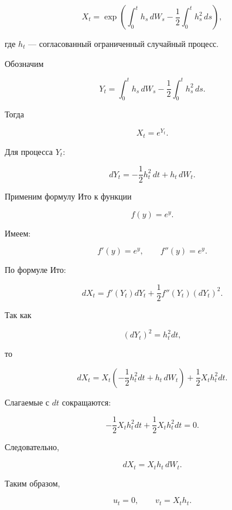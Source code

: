 \[
X_t=
\exp\left(
\int_0^t h_s\,dW_s
-
\frac12
\int_0^t h_s^2\,ds
\right),
\]

где \(h_t\) --- согласованный ограниченный случайный процесс.

Обозначим

\[
Y_t=
\int_0^t h_s\,dW_s
-
\frac12
\int_0^t h_s^2\,ds.
\]

Тогда

\[
X_t=e^{Y_t}.
\]

Для процесса \(Y_t\):

\[
dY_t=
-\frac12 h_t^2\,dt+h_t\,dW_t.
\]

Применим формулу Ито к функции

\[
f(y)=e^y.
\]

Имеем:

\[
f'(y)=e^y,
\qquad
f''(y)=e^y.
\]

По формуле Ито:

\[
dX_t
=
f'(Y_t)dY_t
+
\frac12 f''(Y_t)(dY_t)^2.
\]

Так как

\[
(dY_t)^2=h_t^2dt,
\]

то

\[
dX_t
=
X_t
\left(
-\frac12 h_t^2dt+h_t\,dW_t
\right)
+
\frac12 X_t h_t^2dt.
\]

Слагаемые с \(dt\) сокращаются:

\[
-\frac12 X_t h_t^2dt
+
\frac12 X_t h_t^2dt
=0.
\]

Следовательно,

\[
dX_t=X_t h_t\,dW_t.
\]

Таким образом,

\[
u_t=0,
\qquad
v_t=X_t h_t.
\]
